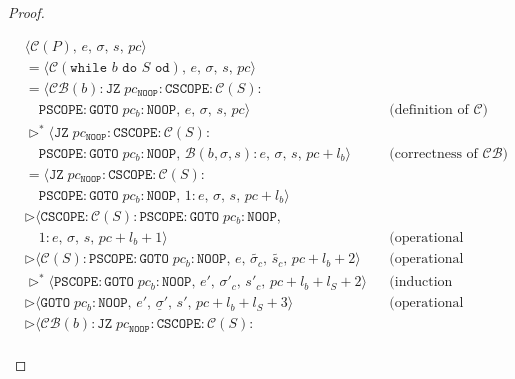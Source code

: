 \documentclass{article}
\begin{document}
\begin{proof}
\begin{itemize}
\begin{itemize}
          \[
              \begin{aligned}
              &\langle \mathcal{C}(P),\, e,\, \sigma,\, s,\, pc \rangle \\
              &= \langle \mathcal{C}(\texttt{while } b \texttt{ do } S \texttt{ od}),\, e,\, \sigma,\, s,\, pc \rangle \\
              &= \langle \mathcal{CB}(b) : \texttt{JZ}\; pc_{\texttt{NOOP}} : \texttt{CSCOPE} : \mathcal{C}(S) : \\
              &\quad \texttt{PSCOPE} : \texttt{GOTO}\; pc_b : \texttt{NOOP},\, e,\, \sigma,\, s,\, pc \rangle
              && \text{(definition of } \mathcal{C}\text{)} \\   
              &\triangleright^\ast \langle \texttt{JZ}\; pc_{\texttt{NOOP}} : \texttt{CSCOPE} : \mathcal{C}(S) : \\
              &\quad \texttt{PSCOPE} : \texttt{GOTO}\; pc_b : \texttt{NOOP},\, \mathcal{B}(b, \sigma, s) : e,\, \sigma ,\, s,\, pc + l_b \rangle
              && \text{(correctness of } \mathcal{CB}\text{)} \\
              &= \langle \texttt{JZ}\; pc_{\texttt{NOOP}} : \texttt{CSCOPE} : \mathcal{C}(S) : \\
              &\quad \texttt{PSCOPE} : \texttt{GOTO}\; pc_b : \texttt{NOOP},\, 1 : e,\, \sigma ,\, s,\, pc + l_b \rangle \\
              &\triangleright \langle \texttt{CSCOPE} : \mathcal{C}(S) : \texttt{PSCOPE} : \texttt{GOTO}\; pc_b : \texttt{NOOP},\, \\
              &\quad 1 : e,\, \sigma ,\, s,\, pc + l_b + 1 \rangle
              && \text{(operational semantics)} \\
              &\triangleright \langle \mathcal{C}(S) : \texttt{PSCOPE} : \texttt{GOTO}\; pc_b : \texttt{NOOP},\, e,\, \tilde{\sigma_c},\, \tilde{s_c},\, pc + l_b + 2 \rangle
              && \text{(operational semantics)} \\
              &\triangleright^\ast \langle \texttt{PSCOPE} : \texttt{GOTO}\; pc_b : \texttt{NOOP},\, e',\, \sigma'_c,\, s'_c,\, pc + l_b + l_S + 2 \rangle
              && \text{(induction hypothesis)} \\
              &\triangleright \langle \texttt{GOTO}\; pc_b : \texttt{NOOP},\, e',\, \underline{\sigma}',\, s',\, pc + l_b + l_S + 3 \rangle
              && \text{(operational semantics)} \\
              &\triangleright \langle \mathcal{CB}(b) : \texttt{JZ}\; pc_{\texttt{NOOP}} : \texttt{CSCOPE} : \mathcal{C}(S) : \\

\end{aligned}\]
\end{itemize}
\end{itemize}
\end{proof}
\end{document}
